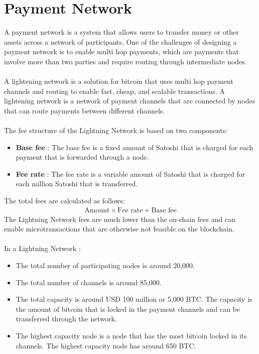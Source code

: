 \documentclass{report}
\begin{document}
\section{Payment Network}
A payment network is a system that allows users to transfer money or other assets across a network of participants. One of the challenges of designing a payment network is to enable multi hop payments, which are payments that involve more than two parties and require routing through intermediate nodes.\\\\
A lightening network is a solution for bitcoin that uses multi hop payment channels and routing to enable fast, cheap, and scalable transactions. A lightening network is a network of payment channels that are connected by nodes that can route payments between different channels.\\\\
The fee structure of the Lightning Network is based on two components:
\begin{itemize}
	\item \textbf{Base fee} : The base fee is a fixed amount of Satoshi that is charged for each payment that is forwarded through a node.
	\item \textbf{Fee rate} : The fee rate is a variable amount of Satoshi that is charged for each million Satoshi that is transferred.
\end{itemize}
The total fees are calculated as follows:
\begin{align*}
	\text{Amount}\times\text{Fee rate} + \text{Base fee}
\end{align*}
The Lightning Network fees are much lower than the on-chain fees and can enable microtransactions that are otherwise not feasible on the blockchain.\\\\
In a Lightning Network :
\begin{itemize}
	\item The total number of participating nodes is around 20,000.
	\item The total number of channels is around 85,000.
	\item The total capacity is around USD 100 million or 5,000 BTC. The capacity is the amount of bitcoin that is locked in the payment channels and can be transferred through the network.
	\item The highest capacity node is a node that has the most bitcoin locked in its channels. The highest capacity node has around 650 BTC.
\end{itemize}
\end{document}
